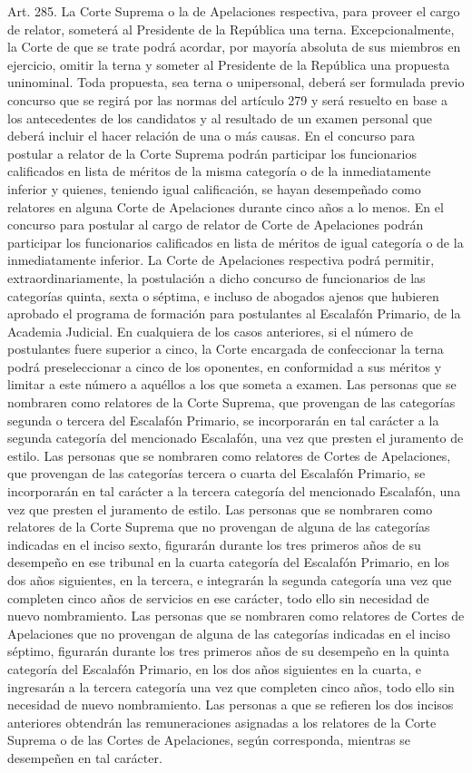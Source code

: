     Art. 285. La Corte Suprema o la de Apelaciones respectiva, para proveer el cargo de relator, someterá al Presidente de la República una terna. Excepcionalmente, la Corte de que se trate podrá acordar, por mayoría absoluta de sus miembros en ejercicio, omitir la terna y someter al Presidente de la República una propuesta uninominal.
    Toda propuesta, sea terna o unipersonal, deberá ser formulada previo concurso que se regirá por las normas del artículo 279 y será resuelto en base a los antecedentes de los candidatos y al resultado de un examen personal que deberá incluir el hacer relación de una o más causas.
    En el concurso para postular a relator de la Corte Suprema podrán participar los funcionarios calificados en lista de méritos de la misma categoría o de la inmediatamente inferior y quienes, teniendo igual calificación, se hayan desempeñado como relatores en alguna Corte de Apelaciones durante cinco años a lo menos.
    En el concurso para postular al cargo de relator de Corte de Apelaciones podrán participar los funcionarios calificados en lista de méritos de igual categoría o de la inmediatamente inferior. La Corte de Apelaciones respectiva podrá permitir, extraordinariamente, la postulación a dicho concurso de funcionarios de las categorías quinta, sexta o séptima, e incluso de abogados ajenos que hubieren aprobado el programa de formación para postulantes al Escalafón Primario, de la Academia Judicial.
    En cualquiera de los casos anteriores, si el número de postulantes fuere superior a cinco, la Corte encargada de confeccionar la terna podrá preseleccionar a cinco de los oponentes, en conformidad a sus méritos y limitar a este número a aquéllos a los que someta a examen.
    Las personas que se nombraren como relatores de la Corte Suprema, que provengan de las categorías segunda o tercera del Escalafón Primario, se incorporarán en tal carácter a la segunda categoría del mencionado Escalafón, una vez que presten el juramento de estilo.
    Las personas que se nombraren como relatores de Cortes de Apelaciones, que provengan de las categorías tercera o cuarta del Escalafón Primario, se incorporarán en tal carácter a la tercera categoría del mencionado Escalafón, una vez que presten el juramento de estilo.
    Las personas que se nombraren como relatores de la Corte Suprema que no provengan de alguna de las categorías indicadas en el inciso sexto, figurarán durante los tres primeros años de su desempeño en ese tribunal en la cuarta categoría del Escalafón Primario, en los dos años siguientes, en la tercera, e integrarán la segunda categoría una vez que completen cinco años de servicios en ese carácter, todo ello sin necesidad de nuevo nombramiento.
    Las personas que se nombraren como relatores de Cortes de Apelaciones que no provengan de alguna de las categorías indicadas en el inciso séptimo, figurarán durante los tres primeros años de su desempeño en la quinta categoría del Escalafón Primario, en los dos años siguientes en la cuarta, e ingresarán a la tercera categoría una vez que completen cinco años, todo ello sin necesidad de nuevo nombramiento.
    Las personas a que se refieren los dos incisos anteriores obtendrán las remuneraciones asignadas a los relatores de la Corte Suprema o de las Cortes de Apelaciones, según corresponda, mientras se desempeñen en tal carácter.

